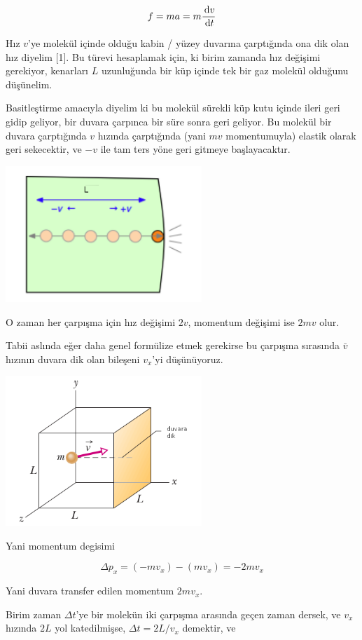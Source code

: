 \documentclass[12pt,fleqn]{article}\usepackage{../../common}
\begin{document}
$$
f = m a = m \frac{\,\mathrm{d} v}{\,\mathrm{d} t}
$$

Hız $v$'ye molekül içinde olduğu kabin / yüzey duvarına çarptığında ona dik olan
hız diyelim [1]. Bu türevi hesaplamak için, ki birim zamanda hız değişimi
gerekiyor, kenarları $L$ uzunluğunda bir küp içinde tek bir gaz molekül olduğunu
düşünelim.

Basitleştirme amacıyla diyelim ki bu molekül sürekli küp kutu içinde ileri geri
gidip geliyor, bir duvara çarpınca bir süre sonra geri geliyor. Bu molekül bir
duvara çarptığında $v$ hızında çarptığında (yani $mv$ momentumuyla) elastik
olarak geri sekecektir, ve $-v$ ile tam ters yöne geri gitmeye başlayacaktır.

\includegraphics[width=20em]{phy_005_basics_04.png}

O zaman her çarpışma için hız değişimi $2v$, momentum değişimi ise $2mv$
olur.

Tabii aslında eğer daha genel formülize etmek gerekirse bu çarpışma sırasında
$\bar{v}$ hızının duvara dik olan bileşeni $v_x$'yi düşünüyoruz.

\includegraphics[width=20em]{phy_005_basics_05.png}

Yani momentum degisimi

$$
\Delta p_x = (-m v_x) - (m v_x) = - 2 m v_x 
$$

Yani duvara transfer edilen momentum $2 m v_x$. 

Birim zaman $\Delta t$'ye bir molekün iki çarpışma arasında geçen zaman dersek,
ve $v_x$ hızında $2L$ yol katedilmişse, $\Delta t  = 2 L / v_x$ demektir, ve
\end{document}

